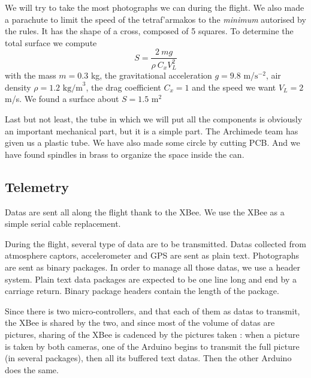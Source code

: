 \documentclass[twocolumn,10pt]{article}
\newcommand\tet{\textgreek{tetraf'armakos} }
\begin{document}
    \par We will try to take the most photographs we can during the flight. We also made a parachute to limit the speed of the \tet to the \textit{minimum} autorised by the rules. It has the shape of a cross, composed of 5 squares. To determine the total surface we compute
    \[ S=\frac{2\ mg}{\rho\ C_{x}V_{L}^2} \]
    with the mass $m=0.3$ kg, the gravitational acceleration $g=9.8$ m/$\textrm{s}^{-2}$, air density $\rho=1.2 \textrm{ kg/m}^3$, the drag coefficient $C_{x}=1$ and the speed we want $V_{L}=2$ m/s. We found a surface about $S=1.5 \textrm{ m}^2$
    
    \par Last but not least, the tube in which we will put all the components is obviously an important mechanical part, but it is a simple part. The Archimede team has given us a plastic tube. We have also made some circle by cutting PCB. And we have found spindles in brass to organize the space inside the can.
    \subsection{Telemetry}
    \par Datas are sent all along the flight thank to the XBee. We use the XBee as a simple serial cable replacement. 
    \par During the flight, several type of data are to be transmitted. Datas collected from atmosphere captors, accelerometer and GPS are sent as plain text. Photographs are sent as binary packages. In order to manage all those datas, we use a header system. Plain text data packages are expected to be one line long and end by a carriage return. Binary package headers contain the length of the package. 
    \par Since there is two micro-controllers, and that each of them as datas to transmit, the XBee is shared by the two, and since most of the volume of datas are pictures, sharing of the XBee is cadenced by the pictures taken : when a picture is taken by both cameras,  one of the Arduino begins to transmit the full picture (in several packages), then all its buffered text datas. Then the other Arduino does the same.
\end{document}

